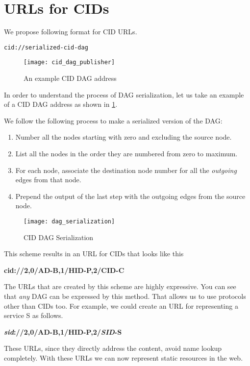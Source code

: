 \section{URLs for CIDs}
\label{sec:urlcid}
We propose following format for CID URLs.
\begin{center}
  \texttt{cid://serialized-cid-dag}
\end{center}
\begin{figure}
  \caption{An example CID DAG address}
  \begin{center}
    \texttt{[image: cid\_dag\_publisher]}
  \end{center}
  \label{fig:cid_dag}
\end{figure}
In order to understand the process of DAG serialization, let us take
an example of a CID DAG address as shown in \ref{fig:cid_dag}.

We follow the following process to make a serialized version of the
DAG:
\begin{enumerate}
  \item{Number all the nodes starting with zero and excluding the
    source node.}
  \item{List all the nodes in the order they are numbered from zero to
    maximum.}
  \item{For each node, associate the destination node number for all
    the \textit{outgoing} edges from that node.}
  \item{Prepend the output of the last step with the outgoing edges
    from the source node.}
\end{enumerate}

\begin{figure}
  \label{fig:cid_dag_serialization}
  \begin{center}
  \texttt{[image: dag\_serialization]}
  \end{center}
  \caption{CID DAG Serialization}
\end{figure}

This scheme results in an URL for CIDs that looks like this
\begin{center}
  \textbf{cid://2,0/AD-B,1/HID-P,2/CID-C}
\end{center}
The URLs that are created by this scheme are highly expressive. You
can see that \emph{any} DAG can be expressed by this method. That
allows us to use protocols other than CIDs too. For example, we could
create an URL for representing a service S as follows.
\begin{center}
  \textbf{\emph{sid}://2,0/AD-B,1/HID-P,2/\emph{SID}-S}
\end{center}
These URLs, since they directly address the content, avoid name lookup
completely. With these URLs we can now represent static resources in
the web.

